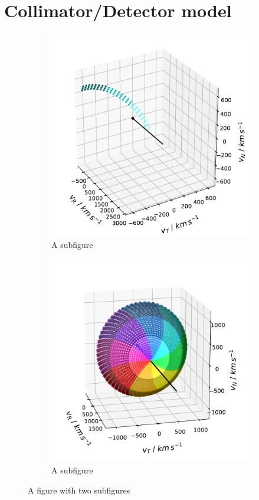 %
%
%
\section{Collimator/Detector model}
\begin{figure}
	\centering
	\begin{subfigure}{.5\textwidth}
		\centering
		\includegraphics[width=1\linewidth]{Figures/col_single_new.pdf}
		\caption{A subfigure}
		\label{fig:sub1}
	\end{subfigure}%
	\begin{subfigure}{.5\textwidth}
		\centering
		\includegraphics[width=1\linewidth]{Figures/col_vspace_normal.pdf}
		\caption{A subfigure}
		\label{fig:sub2}
	\end{subfigure}
	\caption{A figure with two subfigures}
	\label{fig:test}
\end{figure}

